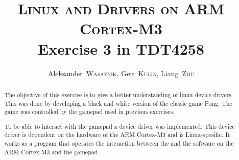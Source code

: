 \documentclass[a4,journal,twoside]{IEEEtran}
\title{
    \textsc{Linux and Drivers on ARM Cortex-M3}\\
    Exercise 3 in TDT4258
}
\author{
    Aleksander~\textsc{Wasaznik},
    Geir~\textsc{Kulia},
    Liang~\textsc{Zhu}
}
\begin{document}
\maketitle

\begin{abstract}
The objective of this exercise is to give a better understanding of linux device drivers. This was done by developing a black and white version of the classic game Pong\cite{pong}. The game was controlled by the gamepad used in previous exercises\cite{ex1}\cite{ex2}.

To be able to interact with the gamepad a device driver was implemented. This device driver is dependent on the hardware of the ARM Cortex-M3 and is Linux-spesific. It works as a program that operates the interaction between the and the software on the ARM Cortex-M3 and the gamepad.
\end{abstract}





\end{document}
